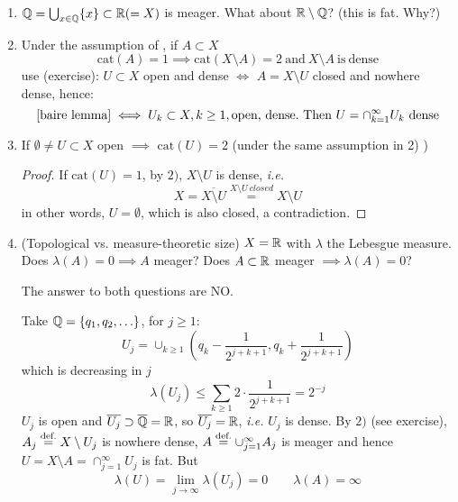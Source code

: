 \documentclass{article}
\begin{document}
\begin{remark}
\label{Baire remark}
\begin{enumerate}[1)]

    \item $\mathbb{Q} = \bigcup_{x\in \mathbb{Q}} \{x\} \subset \mathbb{R} (=X)$ is meager. What about $\mathbb{R} \setminus \mathbb{Q}$? (this is fat. Why?)

    
    \item Under the assumption of , if $A\subset X$  
    $$\text{cat}(A)=1 \implies \text{cat}(X \setminus A)=2 \ \text{and} \ X\setminus A \ \text{is} \ \text{dense}$$
    use (exercise): $U \subset X$ open and dense $\iff$ $A = X\setminus U$ closed and nowhere dense, hence:  
    \begin{equation*}
        \text{\Cref{baire lemma}} \iff U_k \subset X, k\geq 1, \text{open,\ dense}. \ \text{Then} \ U = \cap_{k=1}^{\infty} U_k \ \text{dense}
    \end{equation*}

    
    \item If $\emptyset \neq U \subset X$ open $\implies$ $\text{cat}(U)=2$ (under the same assumption in 2) )
    \begin{proof}
        If $\text{cat}(U)=1$, by $2)$, $X\setminus U$ is dense, \textit{i.e.}  
        $$
        X = \overline{X\setminus U}\overset{X\setminus U \ closed}{=} X\setminus U
        $$
        in other words, $U=\emptyset$, which is also closed, a contradiction.
    \end{proof}

    
    \item (Topological vs. measure-theoretic size)  $X=\mathbb{R}$ with $\lambda$ the Lebesgue measure. Does $\lambda(A)=0 \implies A $ meager? Does $A \subset \mathbb{R}$ meager $\implies \lambda(A)=0$?  

    The answer to both questions are NO.  
    
    Take $\mathbb{Q} = \{q_1, q_2, \ldots\}$, for $j\geq 1$:  
    $$
    U_j = \cup_{k\geq 1} (q_k - \frac{1}{2^{j+k+1}}, q_k + \frac{1}{2^{j+k+1}})
    $$ 
    which is decreasing in $j$  
    $$
    \lambda(U_j) \leq \sum_{k\geq 1} 2 \cdot \frac{1}{2^{j+k+1}} = 2^{-j}
    $$
    $U_j$ is open and $\overline{U_j} \supset \overline{\mathbb{Q}} = \mathbb{R}$, so $\overline{U_j} = \mathbb{R}$, \textit{i.e.} $U_j$ is dense.  
    By $2)$ (see exercise), $A_j \stackrel{\text{def.}}{=} X \setminus U_j$ is nowhere dense, $A \stackrel{\text{def.}}{=} \cup_{j=1}^{\infty} A_j$ is meager and hence $U = X\setminus A=\cap_{j=1}^{\infty} U_j$ is fat. But  
    $$
    \lambda(U) = \lim_{j\to \infty} \lambda(U_j) = 0 \qquad \lambda(A)=\infty
    $$
\end{enumerate}
\end{remark}
\end{document}
